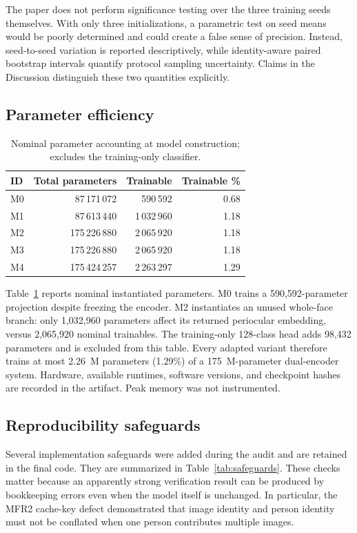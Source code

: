 \documentclass[10pt,journal,compsoc]{IEEEtran}
\begin{document}
The paper does not perform significance testing over the three training seeds themselves. With only three initializations, a parametric test on seed means would be poorly determined and could create a false sense of precision. Instead, seed-to-seed variation is reported descriptively, while identity-aware paired bootstrap intervals quantify protocol sampling uncertainty. Claims in the Discussion distinguish these two quantities explicitly.

\subsection{Parameter efficiency}
\begin{table}[h]
\centering
\caption{Nominal parameter accounting at model construction; excludes the training-only classifier.}
\label{tab:params}
\begin{tabular}{lrrr}
\toprule
ID & Total parameters & Trainable & Trainable \%\\
\midrule
M0 & 87\,171\,072 & 590\,592 & 0.68\\
M1 & 87\,613\,440 & 1\,032\,960 & 1.18\\
M2 & 175\,226\,880 & 2\,065\,920 & 1.18\\
M3 & 175\,226\,880 & 2\,065\,920 & 1.18\\
M4 & 175\,424\,257 & 2\,263\,297 & 1.29\\
\bottomrule
\end{tabular}
\end{table}

Table~\ref{tab:params} reports nominal instantiated parameters. M0 trains a 590,592-parameter projection despite freezing the encoder. M2 instantiates an unused whole-face branch: only 1,032,960 parameters affect its returned periocular embedding, versus 2,065,920 nominal trainables. The training-only 128-class head adds 98,432 parameters and is excluded from this table. Every adapted variant therefore trains at most 2.26~M parameters (1.29\%) of a 175~M-parameter dual-encoder system. Hardware, available runtimes, software versions, and checkpoint hashes are recorded in the artifact. Peak memory was not instrumented.

\subsection{Reproducibility safeguards}
Several implementation safeguards were added during the audit and are retained in the final code. They are summarized in Table~\ref{tab:safeguards}. These checks matter because an apparently strong verification result can be produced by bookkeeping errors even when the model itself is unchanged. In particular, the MFR2 cache-key defect demonstrated that image identity and person identity must not be conflated when one person contributes multiple images.
\end{document}
